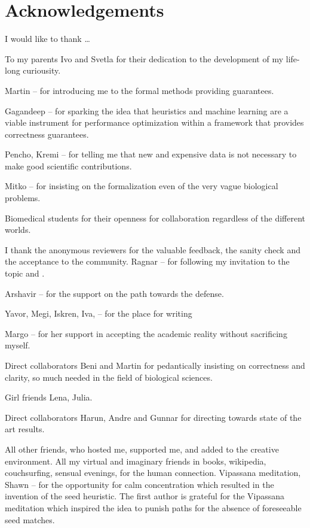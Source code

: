 
\bigskip

\begingroup
\let\clearpage\relax
\let\cleardoublepage\relax
\let\cleardoublepage\relax
\chapter*{Acknowledgements}

\def\thanks#1{%
\begingroup
\leftskip1em
\noindent #1
\par
\endgroup
}

I would like to thank \dots

To my parents Ivo and Svetla for their dedication to the development of my
life-long curiousity.

Martin -- for introducing me to the formal methods providing guarantees.

Gagandeep -- for sparking the idea that heuristics and machine learning are a
viable instrument for performance optimization within a framework that provides
correctness guarantees.

Pencho, Kremi -- for telling me that new and expensive data is not necessary to make
good scientific contributions.

Mitko -- for insisting on the formalization even of the very vague biological
problems.

Biomedical students for their openness for collaboration regardless of the
different worlds.

I thank the anonymous reviewers for the valuable feedback, the sanity check and
the acceptance to the community. 
Ragnar -- for following my invitation to the topic and .

Arshavir -- for the support on the path towards the defense.

Yavor, Megi, Iskren, Iva, -- for the place for writing

Margo -- for her support in accepting the academic reality without sacrificing myself.

Direct collaborators Beni and Martin for pedantically insisting on correctness
and clarity, so much needed in the field of biological sciences.

Girl friends Lena, Julia.

Direct collaborators Harun, Andre and Gunnar for directing towards state of the art results.

All other friends, who hosted me, supported
me, and added to the creative environment.
All my virtual and imaginary friends in books, wikipedia, couchsurfing, sensual
evenings, for the human connection. 
Vipassana meditation, Shawn -- for the opportunity for calm concentration which
resulted in the invention of the seed heuristic. The first author is grateful
for the Vipassana meditation which inspired the idea to punish paths for the
absence of foreseeable seed matches.

\endgroup
